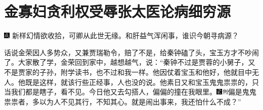 

\chapter{金寡妇贪利权受辱\hspace{.5em}张太医论病细穷源}

{\includegraphics[width=3mm]{../Images/00005}  \kaishu  新样幻情欲收拾，可卿从此世无缘。和肝益气浑闲事，谁识今朝寻病源？}

话说金荣因人多势众，又兼贾瑞勒令，赔了不是，给秦钟磕了头，宝玉方才不吵闹了。大家散了学，金荣回到家中，越想越气，说：“秦钟不过是贾蓉的小舅子，又不是贾家的子孙，附学读书，也不过和我一样。他因仗着宝玉和他好，他就目中无人。他既是这样，就该行些正经事，人也没的说。他素日又和宝玉鬼鬼祟祟的，只当我们都是瞎子，看不见。今日他又去勾搭人，偏偏的撞在我眼里。{\includegraphics[width=3mm]{../Images/00006}\includegraphics[width=3mm]{../Images/00011}\footnotesize \kaishu 偏是鬼鬼祟祟者，多以为人不见其行，不知其心。}就是闹出事来，我还怕什么不成？”

